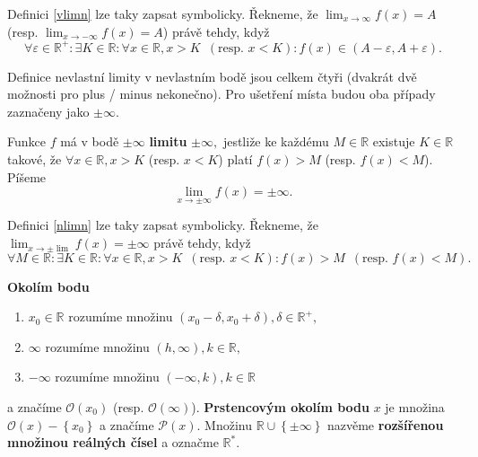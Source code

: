 \begin{pozn}
Definici \ref{vlimn} lze taky zapsat symbolicky. Řekneme, že
$\lim_{x\to \infty} f(x) =A$ (resp. $\lim_{x\to -\infty} f(x) =A$) právě tehdy, když
$$
\forall \varepsilon \in \mathbb R^+:
    \exists K \in \mathbb R: \forall x \in \mathbb R, x > K \,\,\, (\textrm{resp. } x< K):
    f(x) \in \left ( A-\varepsilon, A+\varepsilon \right ).
$$
\end{pozn}

\begin{pozn}
    Definice nevlastní limity v nevlastním bodě jsou celkem čtyři (dvakrát
    dvě možnosti pro plus / minus nekonečno).
    Pro ušetření místa budou oba případy zaznačeny jako $\pm \infty$.
\end{pozn}

\begin{definition}\label{nlimn}
    Funkce $f$ má v bodě $\pm \infty$ \textbf{limitu} $\pm \infty,$
    jestliže ke každému $M \in \mathbb R$ existuje
    $K \in \mathbb R$ takové, že $\forall x \in
    \mathbb R, x> K $ (resp. $x<K$) platí $f(x)>M$ (resp. $f(x) <M$). Píšeme
    $$\lim_{x\to \pm\infty}f(x)=\pm \infty.$$
\end{definition}

\begin{pozn}
    Definici \ref{nlimn} lze taky zapsat symbolicky. Řekneme, že
    $\lim_{x\to \pm\lim} f(x) =\pm\infty$ právě tehdy, když
    $$
    \forall M \in \mathbb R:
        \exists K \in \mathbb R: \forall x \in \mathbb R, x>K\,\,\, (\textrm{resp. }x<K):
        f(x) > M \,\,\, (\textrm{resp. } f(x)<M).
    $$
\end{pozn}

\begin{definition}
\textbf{Okolím bodu}
\begin{enumerate}[$i.$]
\item $x_0\in \mathbb R$ rozumíme množinu $(x_0-\delta,x_0+\delta), \delta \in \mathbb R^+,$
\item $\infty$ rozumíme množinu $(h,\infty), k\in \mathbb R,$
\item $-\infty$ rozumíme množinu $(-\infty,k), k\in \mathbb R$
\end{enumerate}
a značíme $\mathscr O(x_0)$ (resp. $\mathscr O(\infty)$). \textbf{Prstencovým okolím
bodu} $x$ je množina $\mathscr O(x)-\left \{ x_0 \right \} $ a značíme $\mathscr P(x).$
Množinu $\mathbb R \cup \left \{ \pm \infty \right \} $ nazvěme \textbf{rozšířenou množinou
reálných čísel} a označme $\mathbb R^*.$
\end{definition}

